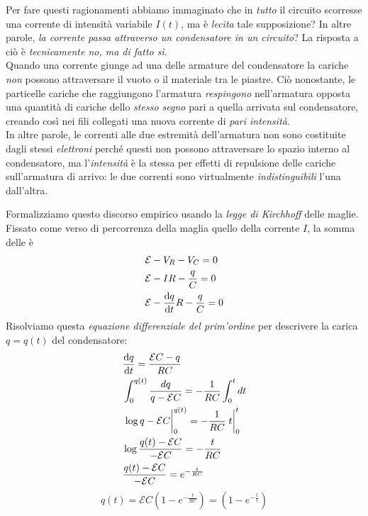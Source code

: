 \begin{observe}\label{correntevariabile}
	Per fare questi ragionamenti abbiamo immaginato che in \textit{tutto} il circuito scorresse una corrente di intensità variabile $I(t)$, ma è \textit{lecita} tale supposizione? In altre parole, \textit{la corrente passa attraverso un condensatore in un circuito}? La risposta a ciò è \textit{tecnicamente no, ma di fatto sì}.\\
	Quando una corrente giunge ad una delle armature del condensatore la cariche \textit{non} possono attraversare il vuoto o il materiale tra le piastre. Ciò nonostante, le particelle cariche che raggiungono l'armatura \textit{respingono} nell'armatura opposta una quantità di cariche dello \textit{stesso segno} pari a quella arrivata sul condensatore, creando così nei fili collegati una nuova corrente di \textit{pari intensità}.\\
	In altre parole, le correnti alle due estremità dell'armatura non sono costituite dagli stessi \textit{elettroni} perché questi non possono attraversare lo spazio interno al condensatore, ma l'\textit{intensità} è la stessa per effetti di repulsione delle cariche sull'armatura di arrivo: le due correnti sono virtualmente \textit{indistinguibili} l'una dall'altra.
\end{observe}
Formalizziamo questo discorso empirico usando la \textit{legge di Kirchhoff} delle maglie. Fissato come verso di percorrenza della maglia quello della corrente $I$, la somma delle \ddp è
\begin{align*}
	&\mathcal{E}-V_R-V_C=0\\
	&\mathcal{E}-IR-\frac{q}{C}=0\\
	&\mathcal{E}-\dv{q}{t}R-\frac{q}{C}=0
\end{align*}
Risolviamo questa \textit{equazione differenziale del prim'ordine} per descrivere la carica $q=q(t)$ del condensatore:
\begin{align*}%
	&\dv{q}{t}=\frac{\mathcal{E}C-q}{RC}\\ &\int_{0}^{q(t)}\frac{dq}{q-\mathcal{E}C}=-\frac{1}{RC}\int_{0}^{t}dt\\
	&\eval{\log{q-\mathcal{E}C}}_{0}^{q(t)}=-\frac{1}{RC}\eval{t}_{0}^{t}\\
	&\log{\frac{q(t)-\mathcal{E}C}{-\mathcal{E}C}}=-\frac{t}{RC}\\
	&\frac{q(t)-\mathcal{E}C}{-\mathcal{E}C}=e^{-\frac{t}{RC}}
\end{align*}
\begin{equation}
	q(t)=\mathcal{E}C\left(1-e^{-\frac{t}{RC}}\right)=\left(1-e^{-\frac{t}{\tau}}\right)
\end{equation}
